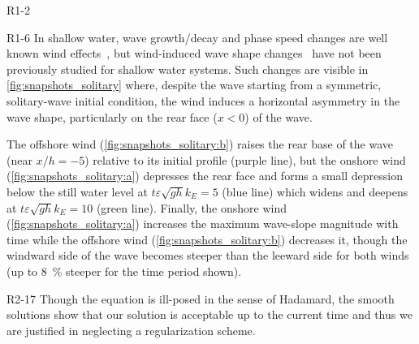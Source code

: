 \documentclass{jfm}
\renewcommand*{\epsilon}{\varepsilon}
\begin{document}
\begin{LineLabel}{R1-2}
\begin{LineLabel}{R1-6}
In shallow water, wave growth/decay and phase speed changes are well
known wind effects~\citep[\eg][]{miles1957generation,cavaleri1981wind},
but wind-induced wave shape changes~\citep{zdyrski2020wind} have not
been previously studied for shallow water systems.
Such changes are visible in \cref{fig:snapshots_solitary} where, despite
the wave starting from a symmetric, solitary-wave initial condition, the
wind induces a horizontal asymmetry in the wave shape, particularly on
the rear face ($x<0$) of the wave.
\end{LineLabel}
\end{LineLabel}
The offshore wind (\cref{fig:snapshots_solitary:b}) raises the
rear base of the wave (near $x/h = -5$) relative to its initial profile
(purple line), but the onshore wind (\cref{fig:snapshots_solitary:a})
depresses the rear face and forms a small depression below the still
water level at $t\epsilon \sqrt{gh} k_E=5$ (blue line) which widens and
deepens at $t\epsilon \sqrt{gh} k_E=10$ (green line).
Finally, the onshore wind (\cref{fig:snapshots_solitary:a})
increases the maximum wave-slope magnitude with time while the offshore
wind (\cref{fig:snapshots_solitary:b}) decreases it, though the windward
side of the wave becomes steeper than the leeward side for both winds
(up to \SI{8}{\percent} steeper for the time period shown).
\begin{LineLabel}{R2-17}
Though the equation is ill-posed in the sense of Hadamard, the smooth
solutions show that our solution is acceptable up to the current time
and thus we are justified in neglecting a regularization scheme.
\end{LineLabel}
\end{document}
